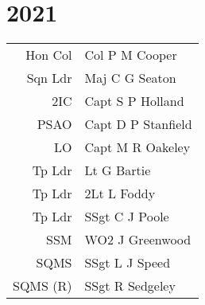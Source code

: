 \chapter*{2021}

\begin{center}
  \begin{tabular}{rl}
    Hon Col & Col P M Cooper \\
    Sqn Ldr & Maj C G Seaton \\
    2IC & Capt S P Holland \\
    PSAO & Capt D P Stanfield \\
    LO & Capt M R Oakeley \\
    Tp Ldr & Lt G Bartie \\
    Tp Ldr & 2Lt L Foddy \\
    Tp Ldr & SSgt C J Poole \\
    SSM & WO2 J Greenwood \\
    SQMS & SSgt L J Speed \\
    SQMS (R) & SSgt R Sedgeley \\
  \end{tabular}
\end{center}

